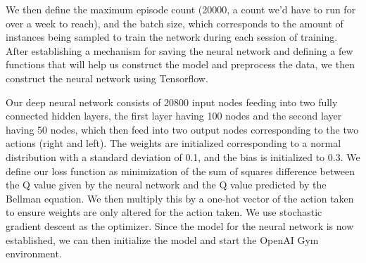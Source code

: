 \documentclass[12pt]{article}
\theoremstyle{plain}
\theoremstyle{definition}
\theoremstyle{remark}
\theoremstyle{plain}
\begin{document}
 We then define the maximum episode count (20000, a count we'd have to run for over a week to reach), and the batch size, which corresponds to the amount of instances being sampled to train the network during each session of training.  After establishing a mechanism for saving the neural network and defining a few functions that will help us construct the model and preprocess the data, we then construct the neural network using Tensorflow.
\par
Our deep neural network consists of 20800 input nodes feeding into two fully connected hidden layers, the first layer having 100 nodes and the second layer having 50 nodes, which then feed into two output nodes corresponding to the two actions (right and left).  The weights are initialized corresponding to a normal distribution with a standard deviation of 0.1, and the bias is initialized to 0.3.  We define our loss function as minimization of the sum of squares difference between the Q value given by the neural network and the Q value predicted by the Bellman equation. We then multiply this by a one-hot vector of the action taken to ensure weights are only altered for the action taken. We use stochastic gradient descent as the optimizer.  Since the model for the neural network is now established, we can then initialize the model and start the OpenAI Gym environment.
\par
\end{document}
